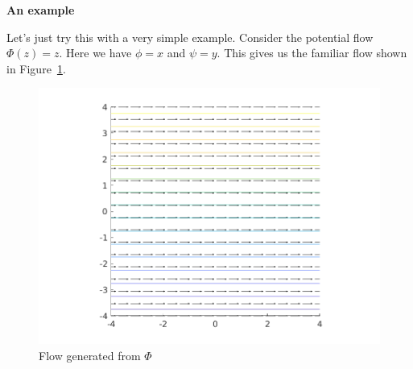 \documentclass{article}
\begin{document}
\textbf{An example}

Let's just try this with a very simple example. Consider the potential
flow $\Phi(z) = z$. Here we have $\phi = x$ and $\psi = y$. This gives
us the familiar flow shown in Figure~\ref{fig:mt-1}.
%
\begin{figure}[ht]
    \includegraphics[width=35em]{mt_ex1_1}
    \centering
    \caption{Flow generated from $\Phi$}
    \label{fig:mt-1}
\end{figure}
\end{document}
